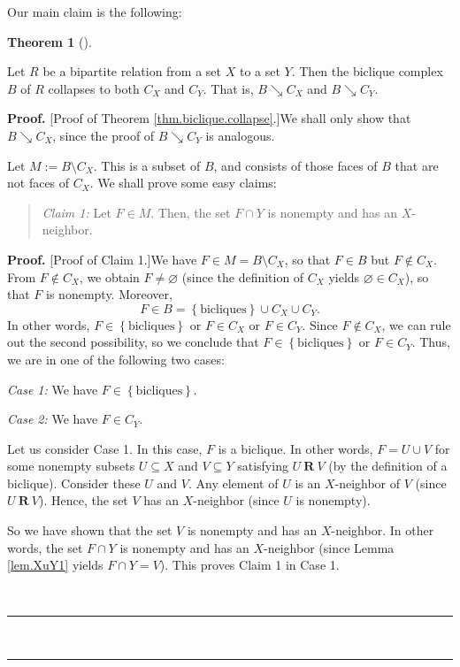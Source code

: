 \documentclass[numbers=enddot,12pt,final,onecolumn,notitlepage]{scrartcl}%
\theoremstyle{definition}
\newtheorem{theo}{Theorem}[section]
\newenvironment{theorem}[1][]
{\begin{theo}[#1]\begin{leftbar}}
{\end{leftbar}\end{theo}}
\newenvironment{statement}{\begin{quote}}{\end{quote}}
\newenvironment{proof}[1][Proof]{\noindent\textbf{#1.} }{\ \rule{0.5em}{0.5em}}
\newenvironment{vershort}{}{}
\begin{document}
Our main claim is the following:


\begin{theorem}
\label{thm.biclique.collapse}
  Let $R$ be a bipartite relation from a set $X$ to a set $Y$.
  Then the biclique complex $B$ of $R$ collapses to both $C_{X}$ and $C_{Y}$.
  That is, $B\searrow C_{X}$ and $B\searrow C_{Y}$.
\end{theorem}


\begin{proof}
[Proof of Theorem \ref{thm.biclique.collapse}.]We shall only show that
$B\searrow C_{X}$, since the proof of $B\searrow C_{Y}$ is analogous.

Let $M:=B\setminus C_{X}$. This is a subset of $B$, and consists of those
faces of $B$ that are not faces of $C_{X}$. We shall prove some easy claims:

\begin{statement}
\textit{Claim 1:} Let $F\in M$. Then, the set $F\cap Y$ is nonempty and has an
$X$-neighbor.
\end{statement}

\begin{proof}
[Proof of Claim 1.]We have $F\in M=B\setminus C_{X}$, so that $F\in B$ but
$F\notin C_{X}$. From $F\notin C_{X}$, we obtain $F\neq\varnothing$ (since the
definition of $C_{X}$ yields $\varnothing\in C_{X}$), so that $F$ is nonempty.
Moreover,
\[
F\in B=\left\{  \text{bicliques}\right\}  \cup C_{X}\cup C_{Y}.
\]
In other words, $F\in\left\{  \text{bicliques}\right\}  $ or $F\in C_{X}$ or
$F\in C_{Y}$. Since $F\notin C_{X}$, we can rule out the second possibility,
so we conclude that $F\in\left\{  \text{bicliques}\right\}  $ or $F\in C_{Y}$.
Thus, we are in one of the following two cases:

\textit{Case 1:} We have $F\in\left\{  \text{bicliques}\right\}  $.

\textit{Case 2:} We have $F\in C_{Y}$.

\begin{vershort}
Let us consider Case 1. In this case, $F$ is a biclique. In other words,
$F=U\cup V$ for some nonempty subsets $U\subseteq X$ and $V\subseteq Y$
satisfying $U\ \mathbf{R}\ V$ (by the definition of a biclique). Consider
these $U$ and $V$. Any element of $U$ is an $X$-neighbor of $V$ (since
$U\ \mathbf{R}\ V$). Hence, the set $V$ has an $X$-neighbor (since $U$ is nonempty).

So we have shown that the set $V$ is nonempty and has an $X$-neighbor. In
other words, the set $F\cap Y$ is nonempty and has an $X$-neighbor (since
Lemma \ref{lem.XuY1} yields $F\cap Y=V$). This proves Claim 1 in Case 1.
\end{vershort}


\end{proof}
\end{proof}
\end{document}
